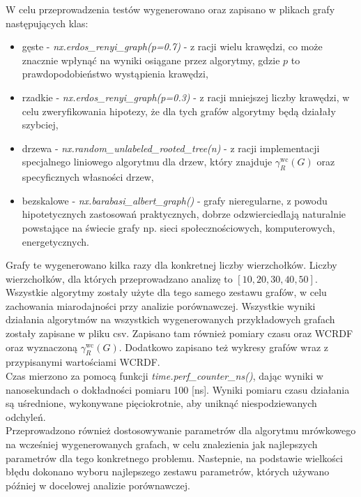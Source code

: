 W celu przeprowadzenia testów wygenerowano oraz zapisano w plikach grafy następujących klas: 
\begin{itemize}
    \item gęste - \textit{nx.erdos\_renyi\_graph(p=0.7)} - z racji wielu krawędzi, co może znacznie wpłynąć na wyniki osiągane przez algorytmy, gdzie $p$ to prawdopodobieństwo wystąpienia krawędzi,
    \item rzadkie - \textit{nx.erdos\_renyi\_graph(p=0.3)} - z racji mniejszej liczby krawędzi, w celu zweryfikowania hipotezy, że dla tych grafów algorytmy będą działały szybciej,
    \item drzewa - \textit{nx.random\_unlabeled\_rooted\_tree(n)} - z racji implementacji specjalnego liniowego algorytmu dla drzew, który znajduje $\gamma_{R}^{\text{wc}}(G)$ oraz specyficznych własności drzew,
    \item bezskalowe - \textit{nx.barabasi\_albert\_graph()} - grafy nieregularne, z powodu hipotetycznych zastosowań praktycznych, dobrze odzwierciedlają naturalnie powstające na świecie grafy np. sieci społecznościowych, komputerowych, energetycznych.
\end{itemize}

Grafy te wygenerowano kilka razy dla konkretnej liczby wierzchołków. Liczby wierzchołków, dla których przeprowadzano analizę to $[10, 20, 30, 40, 50]$. Wszystkie algorytmy zostały użyte dla tego samego zestawu grafów, w celu zachowania miarodajności przy analizie porównawczej. Wszystkie wyniki działania algorytmów na wszystkich wygenerowanych przykładowych grafach zostały zapisane w pliku csv. Zapisano tam również pomiary czasu oraz WCRDF oraz wyznaczoną $\gamma_{R}^{\text{wc}}(G)$. Dodatkowo zapisano też wykresy grafów wraz z przypisanymi wartościami WCRDF.\\

Czas mierzono za pomocą funkcji \textit{time.perf\_counter\_ns()}, dając wyniki w nanosekundach o dokładności pomiaru 100 [ns]. Wyniki pomiaru czasu działania są uśrednione, wykonywane pięciokrotnie, aby uniknąć niespodziewanych odchyleń.\\

Przeprowadzono również dostosowywanie parametrów dla algorytmu mrówkowego na wcześniej wygenerowanych grafach, w celu znalezienia jak najlepszych parametrów dla tego konkretnego problemu. Nastepnie, na podstawie wielkości błędu dokonano wyboru najlepszego zestawu parametrów, których używano później w docelowej analizie porównawczej.\\

